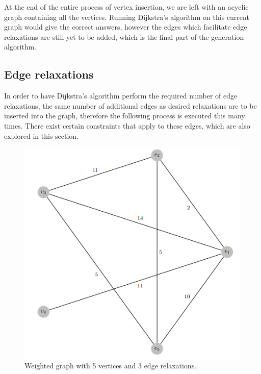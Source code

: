 \documentclass{l4proj}
\begin{document}
At the end of the entire process of vertex insertion, we are left with an acyclic graph containing all the vertices. Running Dijkstra's algorithm on this current graph would give the correct answers, however the edges which facilitate edge relaxations are still yet to be added, which is the final part of the generation algorithm.

\subsection{Edge relaxations}
\label{sec:er}

In order to have Dijkstra's algorithm perform the required number of edge relaxations, the same number of additional edges as desired relaxations are to be inserted into the graph, therefore the following process is executed this many times. There exist certain constraints that apply to these edges, which are also explored in this section.

\begin{figure}
    \centering
    \includegraphics[width=0.6\linewidth]{images/relaxWeight.png}    

    \caption{Weighted graph with 5 vertices and 3 edge relaxations.}
    \label{fig:relaxWeight} 
\end{figure}
\end{document}
